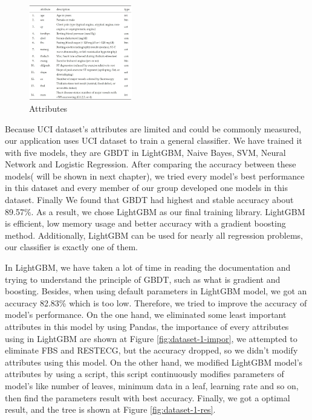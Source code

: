 \documentclass[letterpaper]{article} %
\begin{document}
\begin{figure}[!htbp]
\centering\includegraphics[width=0.4\textwidth]{dataset-1}
\caption{Attributes}
\label{fig:dataset-1}
\end{figure}

Because UCI dataset's attributes are limited and could be commonly measured, our application uses UCI dataset to train a general classifier. We have trained it with five models, they are GBDT in LightGBM, Naive Bayes, SVM, Neural Network and Logistic Regression. After comparing the accuracy between these models( will be shown in next chapter), we tried every model's best performance in this dataset and every member of our group developed one models in this dataset. Finally We found that GBDT had highest and stable accuracy about 89.57\%. As a result, we chose LightGBM as our final training library. LightGBM is efficient, low memory usage and better accuracy with a gradient boosting method. Additionally, LightGBM can be used for nearly all regression problems, our classifier is exactly one of them.

In LightGBM, we have taken a lot of time in reading the documentation and trying to understand the principle of GBDT, such as what is gradient and boosting. Besides, when using default parameters in LightGBM model, we got an accuracy 82.83\% which is too low. Therefore, we tried to improve the accuracy of model's performance. On the one hand, we eliminated some least important attributes in this model by using Pandas, the importance of every attributes using in LightGBM are shown at Figure \ref{fig:dataset-1-impor}, we attempted to eliminate FBS and RESTECG, but the accuracy dropped, so we didn't modify attributes using this model. On the other hand, we modified LightGBM model's attributes by using a script, this script continuously modifies parameters of model's like number of leaves, minimum data in a leaf, learning rate and so on, then find the parameters result with best accuracy. Finally, we got a optimal result, and the tree is shown at Figure \ref{fig:dataset-1-res}.
\end{document}
